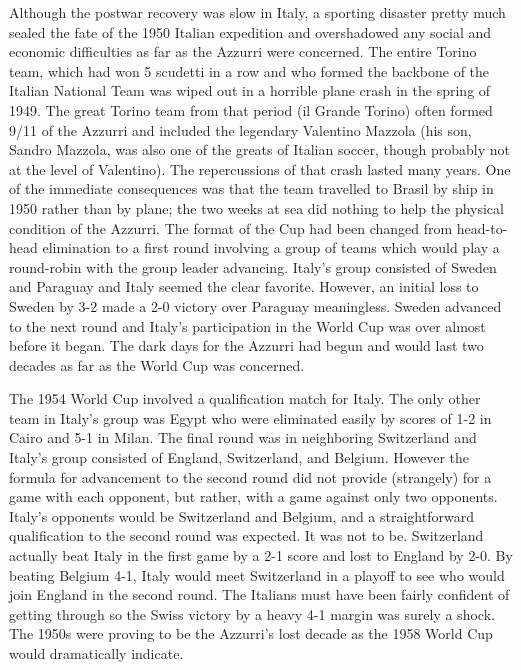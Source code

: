 Although the postwar recovery was slow in Italy, a sporting disaster pretty 
much sealed the fate of the 1950 Italian expedition and overshadowed any social
and economic difficulties as far as the Azzurri were concerned.  The entire
Torino team, which had won 5 scudetti in a row and who formed the backbone of 
the Italian National Team was wiped out in a horrible plane crash in the spring
of 1949. The great Torino team from that period (il Grande Torino) often formed
9/11 of the Azzurri and included the legendary Valentino Mazzola (his son, 
Sandro Mazzola, was also one of the greats of Italian soccer, though probably 
not at the level of Valentino). The repercussions of that crash lasted many 
years. One of the immediate consequences was that the team travelled to Brasil 
by ship in 1950 rather than by plane; the two weeks at sea did nothing to help 
the physical condition of the Azzurri. The format of the Cup had been changed 
from head-to-head elimination to a first round involving a group of teams which
would play a round-robin with the group leader advancing. Italy's group 
consisted of Sweden and Paraguay and Italy seemed the clear favorite. However, 
an initial loss to Sweden by 3-2 made a 2-0 victory over Paraguay meaningless.
Sweden advanced to the next round and Italy's participation in the World Cup 
was over almost before it began. The dark days for the Azzurri had begun and 
would last two decades as far as the World Cup was concerned.

The 1954 World Cup involved a qualification match for Italy. The only other 
team in Italy's group was Egypt who were eliminated easily by scores of 1-2 in 
Cairo and 5-1 in Milan. The final round was in neighboring Switzerland and 
Italy's group consisted of England, Switzerland, and Belgium.  However the 
formula for advancement to the second round did not provide (strangely) for a 
game with each opponent, but rather, with a game against only two opponents. 
Italy's opponents would be Switzerland and Belgium, and a straightforward 
qualification to the second round was expected.  It was not to be. Switzerland 
actually beat Italy in the first game by a 2-1 score and lost to England by 2-0.
By beating Belgium 4-1, Italy would meet Switzerland in a playoff to see who 
would join England in the second round. The Italians must have been fairly 
confident of getting through so the Swiss victory by a heavy 4-1 margin was 
surely a shock. The 1950s were proving to be the Azzurri's lost decade as the 
1958 World Cup would dramatically indicate.

